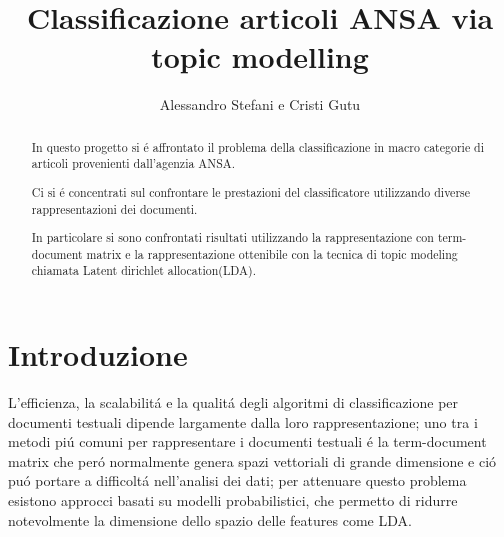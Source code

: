 \documentclass[runningheads]{llncs}
\begin{document}
%
\title{Classificazione articoli ANSA via topic modelling}
%
%
\author{%
  Alessandro Stefani e
  Cristi Gutu}
%
%
%
\maketitle
%
\begin{abstract}
In questo progetto si \'e affrontato il problema della classificazione in macro categorie di articoli provenienti dall'agenzia ANSA.

Ci si \'e concentrati sul confrontare le prestazioni del classificatore utilizzando diverse rappresentazioni dei documenti.

In particolare si sono confrontati risultati utilizzando la rappresentazione con term-document matrix e la rappresentazione ottenibile con la tecnica di topic modeling chiamata Latent dirichlet allocation(LDA)\cite{LDA}.

\end{abstract}


\section{Introduzione}
\label{sec:introduzione}
L'efficienza, la scalabilit\'a e la qualit\'a degli algoritmi di classificazione per documenti testuali dipende largamente dalla loro rappresentazione; uno tra i metodi pi\'u comuni per rappresentare i documenti testuali \'e la term-document matrix che per\'o normalmente genera spazi vettoriali di grande dimensione e ci\'o pu\'o portare a difficolt\'a nell'analisi dei dati; per attenuare questo problema esistono approcci basati su modelli probabilistici, che permetto di ridurre notevolmente la dimensione dello spazio delle features come LDA.
\end{document}
